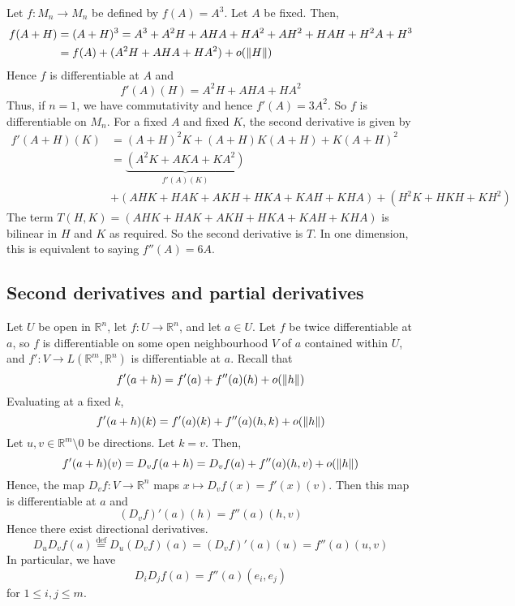 \begin{example}
	Let \( f \colon M_n \to M_n \) be defined by \( f(A) = A^3 \).
	Let \( A \) be fixed.
	Then,
	\begin{align*}
		f(A+H) &= (A+H)^3 = A^3 + A^2 H + AHA + H A^2 + A H^2 + HAH + H^2 A + H^3 \\
		&= f(A) + (A^2 H + AHA + H A^2) + o\qty(\norm{H})
	\end{align*}
	Hence \( f \) is differentiable at \( A \) and
	\[
		f'(A)(H) = A^2 H + AHA + H A^2
	\]
	Thus, if \( n = 1 \), we have commutativity and hence \( f'(A) = 3A^2 \).
	So \( f \) is differentiable on \( M_n \).
	For a fixed \( A \) and fixed \( K \), the second derivative is given by
	\begin{align*}
		f'(A+H)(K) &= (A+H)^2 K + (A+H)K(A+H) + K (A+H)^2 \\
		&= \underbrace{(A^2 K + AKA + K A^2)}_{f'(A)(K)} \\
		&+ (AHK + HAK + AKH + HKA + KAH + KHA) + (H^2 K + HKH + KH^2)
	\end{align*}
	The term \( T(H,K) = (AHK + HAK + AKH + HKA + KAH + KHA) \) is bilinear in \( H \) and \( K \) as required.
	So the second derivative is \( T \).
	In one dimension, this is equivalent to saying \( f''(A) = 6A \).
\end{example}

\subsection{Second derivatives and partial derivatives}
Let \( U \) be open in \( \mathbb R^n \), let \( f \colon U \to \mathbb R^n \), and let \( a \in U \).
Let \( f \) be twice differentiable at \( a \), so \( f \) is differentiable on some open neighbourhood \( V \) of \( a \) contained within \( U \), and \( f' \colon V \to L(\mathbb R^m, \mathbb R^n) \) is differentiable at \( a \).
Recall that
\[
	f'(a+h) = f'(a) + f''(a)(h) + o\qty(\norm{h})
\]
Evaluating at a fixed \( k \),
\[
	f'(a+h)(k) = f'(a)(k) + f''(a)(h,k) + o\qty(\norm{h})
\]
Let \( u, v \in \mathbb R^m \setminus \qty{0} \) be directions.
Let \( k = v \).
Then,
\[
	f'(a+h)(v) = D_v f(a+h) = D_v f(a) + f''(a)(h,v) + o\qty(\norm{h})
\]
Hence, the map \( D_v f \colon V \to \mathbb R^n \) maps \( x \mapsto D_v f(x) = f'(x)(v) \).
Then this map is differentiable at \( a \) and
\[
	(D_v f)'(a)(h) = f''(a)(h,v)
\]
Hence there exist directional derivatives.
\[
	D_u D_v f(a) \overset{\mathrm{def}}{=} D_u (D_v f)(a) = (D_v f)'(a)(u) = f''(a)(u,v)
\]
In particular, we have
\[
	D_i D_j f(a) = f''(a)(e_i, e_j)
\]
for \( 1 \leq i, j \leq m \).

